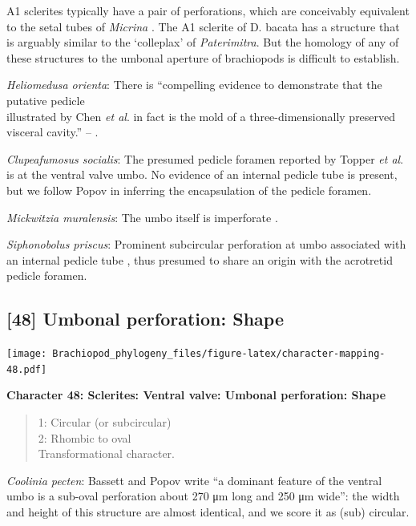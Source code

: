 \documentclass[]{book}
\theoremstyle{definition}
\theoremstyle{definition}
\theoremstyle{definition}
\theoremstyle{remark}
\begin{document}
A1 sclerites typically have a pair of perforations, which are
conceivably equivalent to the setal tubes of \emph{Micrina}
\citep{Holmer2011Firstrecord}. The A1 sclerite of D. bacata has a
structure that is arguably similar to the `colleplax' of
\emph{Paterimitra}. But the homology of any of these structures to the
umbonal aperture of brachiopods is difficult to establish.

\emph{Heliomedusa orienta}: There is ``compelling evidence to
demonstrate that the putative pedicle\\
illustrated by Chen \emph{et al}. \citeyearpar[Figs. 4, 6,
7]{Chen2007Reinterpretationof} in fact is the mold of a
three-dimensionally preserved visceral cavity.'' --
\citet{Zhang2009Architectureand}.

\emph{Clupeafumosus socialis}: The presumed pedicle foramen reported by
Topper \emph{et al}. \citeyearpar{Topper2013Reappraisalof} is at the
ventral valve umbo. No evidence of an internal pedicle tube is present,
but we follow Popov \citeyearpar{Popov1992TheCambrian} in inferring the
encapsulation of the pedicle foramen.

\emph{Mickwitzia muralensis}: The umbo itself is imperforate
\citep{Balthasar2004Shellstructure}.

\emph{Siphonobolus priscus}: Prominent subcircular perforation at umbo
associated with an internal pedicle tube \citep{Popov2009Earlyontogeny},
thus presumed to share an origin with the acrotretid pedicle foramen.

\hypertarget{umbonal-perforation-shape}{%
\subsection*{{[}48{]} Umbonal perforation:
Shape}\label{umbonal-perforation-shape}}

\texttt{[image: Brachiopod\_phylogeny\_files/figure-latex/character-mapping-48.pdf]}

\textbf{Character 48: Sclerites: Ventral valve: Umbonal perforation:
Shape}

\begin{quote}
1: Circular (or subcircular)\\
2: Rhombic to oval\\
Transformational character.
\end{quote}

\emph{Coolinia pecten}: Bassett and Popov write ``a dominant feature of
the ventral umbo is a sub-oval perforation about 270 μm long and 250 μm
wide'': the width and height of this structure are almost identical, and
we score it as (sub) circular.
\end{document}
